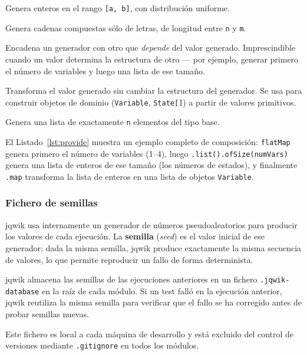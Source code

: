 \documentclass[12pt,a4paper]{article}
\begin{document}
\begin{description}[leftmargin=2em, style=nextline]
  \item[\texttt{Arbitraries.integers().between(a, b)}]
    Genera enteros en el rango \texttt{[a, b]}, con distribución uniforme.
  \item[\texttt{Arbitraries.strings().alpha().ofMinLength(n).ofMaxLength(m)}]
    Genera cadenas compuestas sólo de letras, de longitud entre
    \texttt{n} y \texttt{m}.
  \item[\texttt{.flatMap(f)}]
    Encadena un generador con otro que \emph{depende} del valor generado.
    Imprescindible cuando un valor determina la estructura de otro --- por
    ejemplo, generar primero el número de variables y luego una lista de
    ese tamaño.
  \item[\texttt{.map(f)}]
    Transforma el valor generado sin cambiar la estructura del generador.
    Se usa para construir objetos de dominio (\texttt{Variable},
    \texttt{State[]}) a partir de valores primitivos.
  \item[\texttt{.list().ofSize(n)}]
    Genera una lista de exactamente \texttt{n} elementos del tipo base.
\end{description}

El Listado~\ref{lst:provide} muestra un ejemplo completo de composición:
\texttt{flatMap} genera primero el número de variables (1--4), luego
\texttt{.list().ofSize(numVars)} genera una lista de enteros de ese tamaño
(los números de estados), y finalmente \texttt{.map} transforma la lista
de enteros en una lista de objetos \texttt{Variable}.

\subsubsection{Fichero de semillas}

jqwik usa internamente un generador de números pseudoaleatorios para
producir los valores de cada ejecución. La \textbf{semilla}
(\emph{seed}) es el valor inicial de ese generador: dada la misma semilla,
jqwik produce exactamente la misma secuencia de valores, lo que permite
reproducir un fallo de forma determinista.

jqwik almacena las semillas de las ejecuciones anteriores en un fichero
\texttt{.jqwik-database} en la raíz de cada módulo. Si un test falló en
la ejecución anterior, jqwik reutiliza la misma semilla para verificar
que el fallo se ha corregido antes de probar semillas nuevas.

Este fichero es local a cada máquina de desarrollo y está excluido del
control de versiones mediante \texttt{.gitignore} en todos los módulos.
\end{document}
